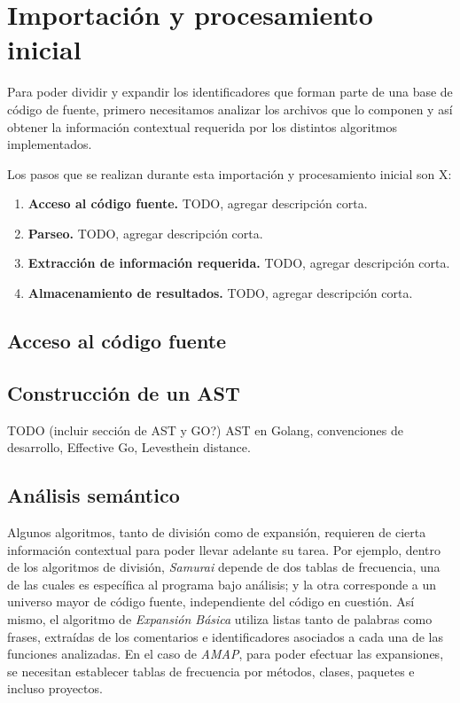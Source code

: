 \section{Importación y procesamiento inicial}

Para poder dividir y expandir los identificadores que forman parte de una base de código de fuente, primero necesitamos analizar los archivos que lo componen y así obtener la información contextual requerida por los distintos algoritmos implementados.

Los pasos que se realizan durante esta importación y procesamiento inicial son X:
\begin{enumerate}
  \item \textbf{Acceso al código fuente.} TODO, agregar descripción corta.
  \item \textbf{Parseo.} TODO, agregar descripción corta.
  \item \textbf{Extracción de información requerida.} TODO, agregar descripción corta.
  \item \textbf{Almacenamiento de resultados.} TODO, agregar descripción corta.
\end{enumerate}

\subsection{Acceso al código fuente}

\subsection{Construcción de un AST}
TODO (incluir sección de AST y GO?)
AST en Golang, convenciones de desarrollo, Effective Go, Levesthein distance.

\subsection{Análisis semántico}
Algunos algoritmos, tanto de división como de expansión, requieren de cierta información contextual para poder llevar adelante su tarea.
Por ejemplo, dentro de los algoritmos de división, \textit{Samurai} depende de dos tablas de frecuencia, una de las cuales es específica al programa bajo análisis; y la otra corresponde a un universo mayor de código fuente, independiente del código en cuestión.
Así mismo, el algoritmo de \textit{Expansión Básica} utiliza listas tanto de palabras como frases, extraídas de los comentarios e identificadores asociados a cada una de las funciones analizadas.
En el caso de \textit{AMAP}, para poder efectuar las expansiones, se necesitan establecer tablas de frecuencia por métodos, clases, paquetes e incluso proyectos.

